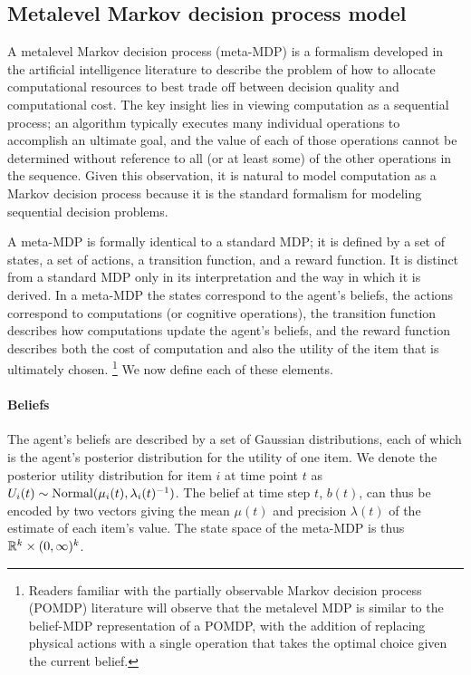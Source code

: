 \documentclass[12pt,a4paperpaper,]{article}
\begin{document}
\subsection{Metalevel Markov decision process
model}

A metalevel Markov decision process (meta-MDP) is a formalism developed in the artificial intelligence literature to describe the problem of how to allocate computational resources to best trade off between decision quality and computational cost. The key insight lies in viewing computation as a sequential process; an algorithm typically executes many individual operations to accomplish an ultimate goal, and the value of each of those operations cannot be determined without reference to all (or at least some) of the other operations in the sequence. Given this observation, it is natural to model computation as a Markov decision process because it is the standard formalism for modeling sequential decision problems.

A meta-MDP is formally identical to a standard MDP; it is defined by a set of states, a set of actions, a transition function, and a reward function. It is distinct from a standard MDP only in its interpretation and the way in which it is derived. In a meta-MDP the states correspond to the agent's beliefs, the actions correspond to computations (or cognitive operations), the transition function describes how computations update the agent's beliefs, and the reward function describes both the cost of computation and also the utility of the item that is ultimately chosen.%
  \footnote{Readers familiar with the partially observable Markov decision process (POMDP) literature will observe that the metalevel MDP is similar to the belief-MDP representation of a POMDP, with the addition of replacing physical actions with a single operation that takes the optimal choice given the current belief.}
We now define each of these elements.


\paragraph{Beliefs}
The agent's beliefs are described by a set of Gaussian distributions, each of which is the agent's posterior distribution for the utility of one item. We denote the posterior utility distribution for item $i$ at time point $t$ as $U_i(t) \sim \mathrm{Normal}(\mu_i(t), \lambda_i(t)^{-1})$. The belief at time step $t$, $b(t)$, can thus be encoded by two vectors giving the mean $\mu(t)$ and precision $\lambda(t)$ of the estimate of each item's value. The state space of the meta-MDP is thus $\mathbb{R}^k \times (0,\infty)^k$.
\end{document}
